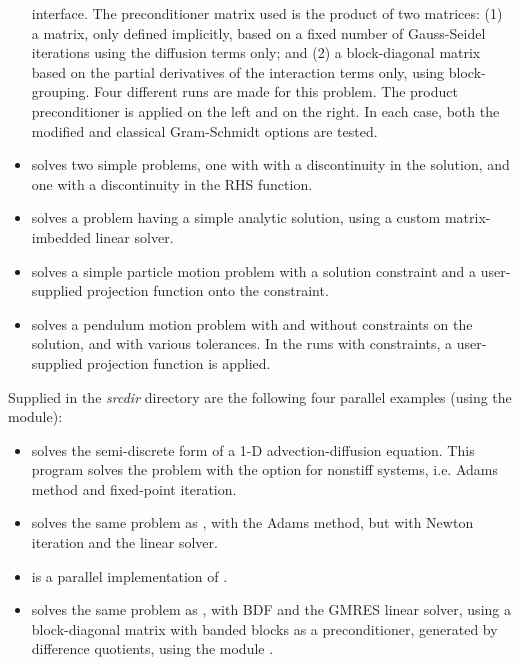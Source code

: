 \begin{itemize}
  {\cvls} interface.
  \newline
  The preconditioner matrix used is the product of two matrices:
  (1) a matrix, only defined implicitly, based on a fixed number of
  Gauss-Seidel iterations using the diffusion terms only; and
  (2) a block-diagonal matrix based on the partial derivatives of the
  interaction terms only, using block-grouping.
  \newline
  Four different runs are made for this problem.
  The product preconditioner is applied on the left and on the right.
  In each case, both the modified and classical Gram-Schmidt options
  are tested.
\item {} solves two simple problems, one with with a
  discontinuity in the solution, and one with a discontinuity in the
  RHS function.
\item {} solves a problem having a simple analytic
  solution, using a custom matrix-imbedded linear solver.
\item {} solves a simple particle motion problem
  with a solution constraint and a user-supplied projection function
  onto the constraint.
\item {} solves a pendulum motion problem with and
  without constraints on the solution, and with various tolerances.  In the
  runs with constraints, a user-supplied projection function is applied.
\end{itemize}

\vspace{0.2in}\noindent Supplied in the
{\em srcdir} directory are the following
four parallel examples (using the {\nvecp} module):
\begin{itemize}
\item {} solves the semi-discrete form of a 1-D
  advection-diffusion equation.
  \newline
  This program solves the problem with the option for nonstiff
  systems, i.e. Adams method and fixed-point iteration.
\item {}
  solves the same problem as , with the Adams method,
  but with Newton iteration and the  linear solver.
\item {}
  is a parallel implementation of .
\item {}
  solves the same problem as , with BDF and the GMRES linear
  solver, using a block-diagonal matrix with banded blocks as a preconditioner,
  generated by difference quotients, using the module {\cvbbdpre}.
\end{itemize}

